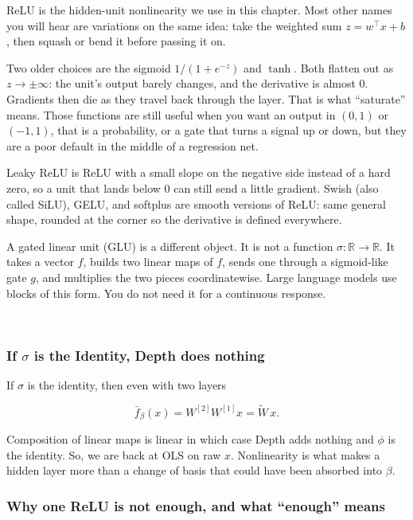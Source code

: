 \documentclass[
]{book}
\begin{document}
ReLU is the hidden-unit nonlinearity we use in this chapter. Most other names you will hear are variations on the same idea: take the weighted sum \(z=w^\top x+b\), then squash or bend it before passing it on.

Two older choices are the sigmoid \(1/(1+e^{-z})\) and \(\tanh\). Both flatten out as \(z\to\pm\infty\): the unit's output barely changes, and the derivative is almost \(0\). Gradients then die as they travel back through the layer. That is what ``saturate'' means. Those functions are still useful when you want an output in \((0,1)\) or \((-1,1)\), that is a probability, or a gate that turns a signal up or down, but they are a poor default in the middle of a regression net.

Leaky ReLU is ReLU with a small slope on the negative side instead of a hard zero, so a unit that lands below \(0\) can still send a little gradient. Swish (also called SiLU), GELU, and softplus are smooth versions of ReLU: same general shape, rounded at the corner so the derivative is defined everywhere.

A gated linear unit (GLU) is a different object. It is not a function \(\sigma:\mathbb{R}\to\mathbb{R}\). It takes a vector \(f\), builds two linear maps of \(f\), sends one through a sigmoid-like gate \(g\), and multiplies the two pieces coordinatewise. Large language models use blocks of this form. You do not need it for a continuous response.

~

\subsubsection*{\texorpdfstring{If \(\sigma\) is the Identity, Depth does nothing}{If \textbackslash sigma is the Identity, Depth does nothing}}\label{if-sigma-is-the-identity-depth-does-nothing}

If \(\sigma\) is the identity, then even with two layers

\[
\bar f_\beta(x)=W^{[2]}W^{[1]}x=\widetilde W\,x.
\]

Composition of linear maps is linear in which case Depth adds nothing and \(\phi\) is the identity. So, we are back at OLS on raw \(x\). Nonlinearity is what makes a hidden layer more than a change of basis that could have been absorbed into \(\beta\).

\subsubsection*{Why one ReLU is not enough, and what ``enough'' means}\label{why-one-relu-is-not-enough-and-what-enough-means}
\end{document}
